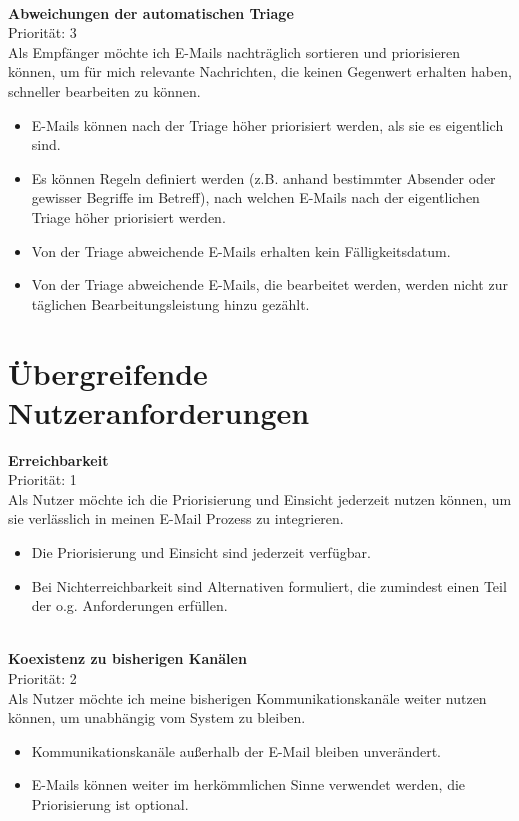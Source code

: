 \noindent
\\ \textbf{Abweichungen der automatischen Triage} \\
Priorität: 3 \\
Als Empfänger möchte ich E-Mails nachträglich sortieren und priorisieren können, um für mich relevante Nachrichten, die keinen Gegenwert erhalten haben, schneller bearbeiten zu können.
\begin{itemize}
    \item E-Mails können nach der Triage höher priorisiert werden, als sie es eigentlich sind.
    \item Es können Regeln definiert werden (z.B. anhand bestimmter Absender oder gewisser Begriffe im Betreff), nach welchen E-Mails nach der eigentlichen Triage höher priorisiert werden.
    \item Von der Triage abweichende E-Mails erhalten kein Fälligkeitsdatum.
    \item Von der Triage abweichende E-Mails, die bearbeitet werden, werden nicht zur täglichen Bearbeitungsleistung hinzu gezählt.
\end{itemize}

\section{Übergreifende Nutzeranforderungen}

\textbf{Erreichbarkeit} \\
Priorität: 1 \\
Als Nutzer möchte ich die Priorisierung und Einsicht jederzeit nutzen können, um sie verlässlich in meinen E-Mail Prozess zu integrieren.
\begin{itemize}
    \item Die Priorisierung und Einsicht sind jederzeit verfügbar.
    \item Bei Nichterreichbarkeit sind Alternativen formuliert, die zumindest einen Teil der o.g. Anforderungen erfüllen.
\end{itemize}

\noindent
\\ \textbf{Koexistenz zu bisherigen Kanälen} \\
Priorität: 2 \\
Als Nutzer möchte ich meine bisherigen Kommunikationskanäle weiter nutzen können, um unabhängig vom System zu bleiben.
\begin{itemize}
    \item Kommunikationskanäle außerhalb der E-Mail bleiben unverändert.
    \item E-Mails können weiter im herkömmlichen Sinne verwendet werden, die Priorisierung ist optional.
\end{itemize}

